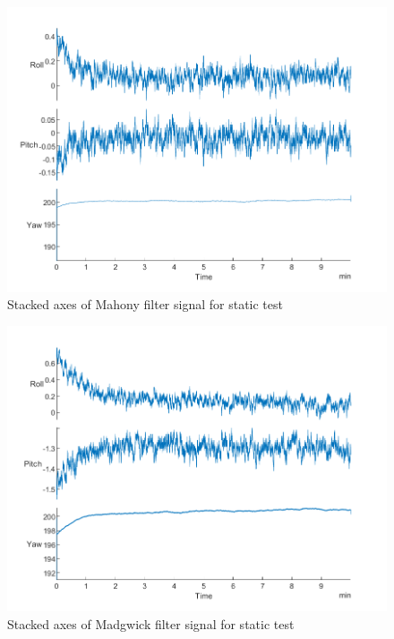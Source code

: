 \begin{figure}[H]
    \centering
    \includegraphics[scale=1]{graphics/Navigation/StackedStaticMahony.png}
    \caption{Stacked axes of Mahony filter signal for static test}
     \label{fig:Stacked axes of Mahony filter signal for static test}
\end{figure}

\begin{figure}[H]
    \centering
    \includegraphics[scale=1]{graphics/Navigation/StackedStaticMadgwick.png}
    \caption{Stacked axes of Madgwick filter signal for static test}
     \label{fig:Stacked axes of Madgwick filter signal for static test}
\end{figure}


